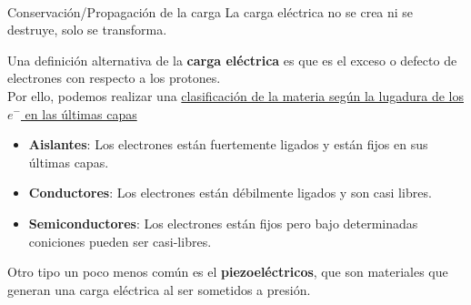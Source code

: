\\

  \raggedright 


\begin{teorema}{Conservación/Propagación de la carga}
    La carga eléctrica no se crea ni se destruye, solo se transforma.
\end{teorema}

\noindent
Una definición alternativa de la \textbf{carga eléctrica} es que es el exceso o defecto de electrones con respecto a los protones. \\
Por ello, podemos realizar una \underline{clasificación de la materia según la lugadura de los $e^-$ en las últimas capas}

\begin{itemize}
    \item \textbf{Aislantes}: Los electrones están fuertemente ligados y están fijos en sus últimas capas. 
    \item \textbf{Conductores}: Los electrones están débilmente ligados y son casi libres.
    \item \textbf{Semiconductores}: Los electrones están fijos pero bajo determinadas coniciones pueden ser casi-libres.
\end{itemize}
Otro tipo un poco menos común es el \textbf{piezoeléctricos}, que son materiales que generan una carga eléctrica al ser sometidos a presión.

